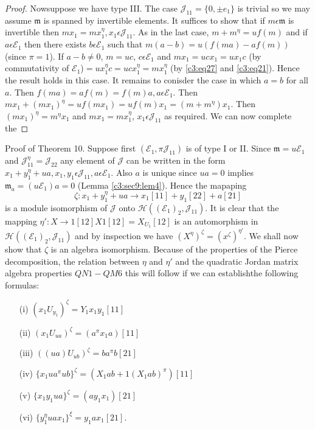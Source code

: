 \begin{proof}
Now\pageoriginale suppose we have type III. The case
$\mathscr{J}_{11}=\{0,\pm e_1\}$ is trivial so we may assume
$\mathfrak{m}$ is spanned by invertible elements. It suffices to show
that if $m\epsilon \mathfrak{m}$ is invertible then $mx_1=mx_1^{\eta},
x_1\epsilon \mathscr{J}_{11}$. As in the last case, $m+m^{\eta}=uf(m)$
and if $a\epsilon\mathcal{E}_1$ then there exists $b\epsilon
\mathcal{E}_1$ such that $m(a-b)=u(f(ma)-af(m))$ (since $\pi=1$). If
$a-b\neq 0$, $m=uc$, $c\epsilon \mathcal{E}_1$ and $mx_1=u c
x_1=ux_1c$ (by commutativity of $\mathcal{E}_1$)$= ux^{\eta}_1c=uc
x^{\eta}_1=mx_1^{\eta}$ (by \eqref{c3:eq27} and \eqref{c3:eq21}). Hence the result holds in
this case. It remains to conisder the case in which $a=b$ for all
$a$. Then $f(ma)=af(m)=f(m)a, a\epsilon \mathcal{E}_1$. Then
$mx_1+(mx_1)^{\eta}=uf(mx_1)=uf(m)x_1= (m+m^{\eta})x_1$. Then
$(mx_1)^{\eta}=m^{\eta}x_1$ and $mx_1=mx_1^{\eta}$, $x_1\epsilon
\mathscr{J}_{11}$ as required.
We can now complete the 
\end{proof}

\noindent
{Proof of Theorem 10.} Suppose first $(\mathcal{E}_1,\pi
\mathscr{J}_{11})$ is of type I or II. Since
$\mathfrak{m}=u\mathcal{E}_1$ and
$\mathscr{J}_{11}^{\eta}=\mathscr{J}_{22}$ any element of
$\mathscr{J}$ can be written in the form $x_1+y_1^{\eta}+ua,
x_1,y_1\epsilon \mathscr{J}_{11}, a\epsilon \mathcal{E}_1$. Also $a$
is unique since $ua=0$ implies $\mathfrak{m}_a=(u\mathcal{E}_1)a=0$
(Lemma \ref{c3:sec9:lem4}). Hence the mapaping
\begin{equation*}
  \zeta: x_1+y_1^{\eta}+ua\to x_1[11]+y_1[22]+a[21]\tag{33}\label{c3:eq33}
\end{equation*}
is a module isomorphism of $\mathscr{J}$ onto
$\mathscr{H}((\mathcal{E}_1)_2, \mathscr{J}_{11})$. It is clear that
the mapping $\eta':X\to 1[12]X 1[12]=X_{U_1}[12]$ is an automorphism
in $\mathscr{H}((\mathcal{E}_1)_2,\mathscr{J}_{11})$ and by inspection
we have $(X^{\eta})^{\zeta}=(x^{\zeta})^{{\eta}'}$. We shall now show
that $\zeta$ is an algebra isomorphism. Because of the properties of
the Pierce decomposition, the relation between $\eta$ and $\eta'$ and
the quadratic Jordan matrix algebra properties $QN1- QM6$ this will
follow if we can establish\pageoriginale the following formulas:
\begin{itemize}
\item[(i)] $(x_1U_{y_1})^{\zeta}=Y_1x_1y_1[11]$

\item[(ii)] $(x_1 U_{ua})^{\zeta}=(a^{\pi}x_1a)[11]$

\item[(iii)] $((ua)U_{ub})^{\zeta}=ba^{\pi}b[21]$

\item[(iv)] $\{x_1ua^{\pi}ub\}^{\zeta}=(X_1ab+1(X_1 ab)^{\pi})[11]$

\item[(v)] $\{x_1y_1 ua\}^{\zeta}=(ay_1x_1)[21]$

\item[(vi)] $\{y^{\eta}_1 ua x_1\}^{\xi}=y_1ax_1[21]$. 
\end{itemize}

